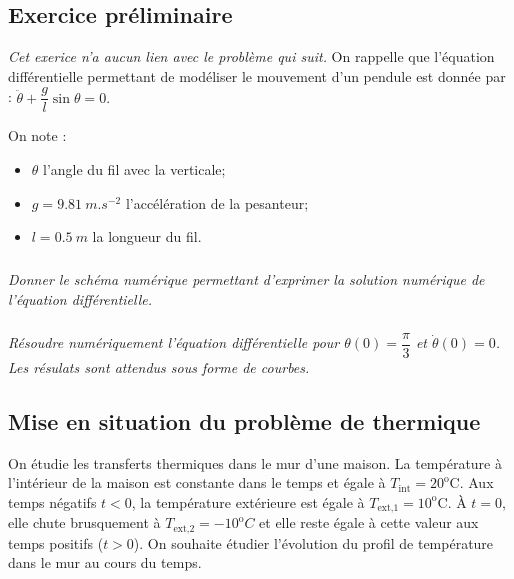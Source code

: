 \documentclass[10pt,fleqn]{article} %
\begin{document}
\def\columnseprulecolor{\color{ocre}}
\setlength{\columnseprule}{0.4pt} 


\vspace{5cm}
\pagestyle{fancy}
\thispagestyle{plain}

\ifprof
\else
\begin{multicols}{2}
\fi


\subsection*{Exercice préliminaire}
\textit{Cet exerice n'a aucun lien avec le problème qui suit.}
On rappelle que l'équation différentielle permettant de modéliser le mouvement d'un pendule est donnée par : 
$
\ddot{\theta} + \dfrac{g}{l} \sin \theta = 0.
$

On note : 
\begin{itemize}
\item $\theta$ l'angle du fil avec la verticale;
\item $g=\SI{9.81}{m.s^{-2}}$ l'accélération de la pesanteur;
\item $l=\SI{0,5}{m}$ la longueur du fil. 
\end{itemize}

\subparagraph{}\textit{Donner le schéma numérique permettant d'exprimer la solution numérique de l'équation différentielle.}

\subparagraph{}\textit{Résoudre numériquement l'équation différentielle pour $\theta(0)=\dfrac{\pi}{3}$ et $\dot{\theta}(0)=0$. Les résulats sont attendus sous forme de courbes. }


\subsection*{Mise en situation du problème de thermique}
\setcounter{exo}{0}
\ifprof
\else
\vspace{.25cm}


On étudie les transferts thermiques dans le mur d’une maison. La température à
l'intérieur de la maison est constante dans le temps et égale à $T_{\text{int}}=20^{\text{o}} \text{C}$. Aux temps négatifs $t<0$, la température extérieure est égale à $T_{\text{ext,1}}=10^{\text{o}} \text{C}$. À $t=0$, elle chute brusquement à $T_{\text{ext,2}}=-10^{\text{o}} C$ et elle reste égale à cette valeur aux temps positifs ($t>0$). On
souhaite étudier l'évolution du profil de température dans le mur au cours du temps.


\end{multicols}
\end{document}
